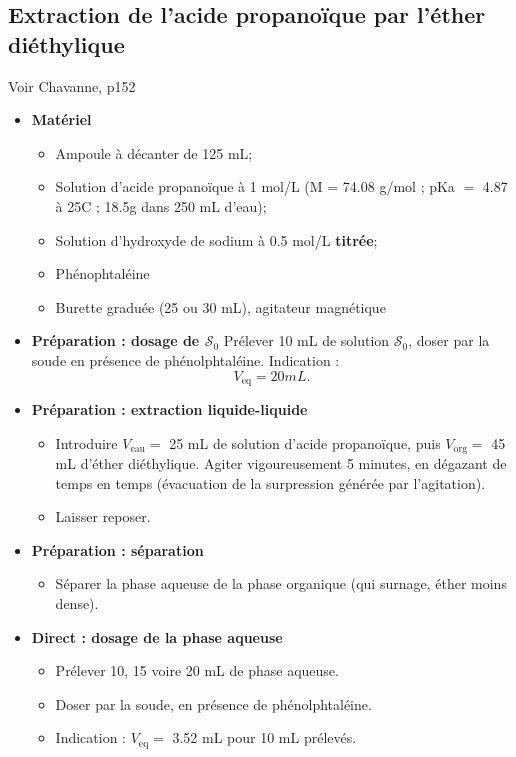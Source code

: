 \documentclass[11pt,a4paper]{report}
\begin{document}
\subsection{Extraction de l'acide propanoïque par l'éther diéthylique}
Voir Chavanne, p152

\begin{itemize}
	\item \textbf{Matériel}
	\begin{itemize}
		\item Ampoule à décanter de 125 mL;
		\item Solution d'acide propanoïque à 1 mol/L (M = 74.08 g/mol ; pKa $=$ 4.87 à 25\degree C ; 						18.5g dans 250 mL d'eau);
		\item Solution d'hydroxyde de sodium à 0.5 mol/L \textbf{titrée};
		\item Phénophtaléine
		\item Burette graduée (25 ou 30 mL), agitateur magnétique
	\end{itemize}
	
	\item \textbf{Préparation : dosage de $\mathcal{S}_0$}
		Prélever 10 mL de solution $\mathcal{S}_0$, doser par la soude en présence de phénolphtaléine. 				Indication :
		\begin{equation}
			V_\text{eq} = 20 mL.
		\end{equation}
		
	\item \textbf{Préparation : extraction liquide-liquide}
	\begin{itemize}
		\item Introduire $V_\text{eau} =$ 25 mL de solution d'acide propanoïque, puis $V_\text{org} =$ 			45 mL d'éther diéthylique. Agiter vigoureusement 5 minutes, en dégazant de temps en temps 				(évacuation de la surpression générée par l'agitation).
		\item Laisser reposer.\\
	\end{itemize}
	
	\item \textbf{Préparation : séparation}
	\begin{itemize}
		\item Séparer la phase aqueuse de la phase organique (qui surnage, éther moins dense).\\
	\end{itemize}
	
	\item \textbf{Direct : dosage de la phase aqueuse}
	\begin{itemize}
		\item Prélever 10, 15 voire 20 mL de phase aqueuse.
		\item Doser par la soude, en présence de phénolphtaléine.
		\item Indication : $V_\text{eq} =$ 3.52 mL pour 10 mL prélevés.\\
	\end{itemize}
	

\end{itemize}
\end{document}
